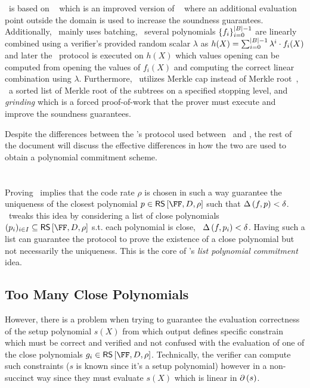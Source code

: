 \documentclass[a4paper,10pt]{article}
\begin{document}
			\plonkyy\ is based on \DEEPFRI~\cite{EPRINT:BGKS19}
			which is an improved version of \FRI~\cite{ICALP:BBHR18} where an additional evaluation
			point outside the domain is used to increase the soundness guarantees.
			Additionally, \plonkyy\ mainly uses batching, \ie\ several polynomials
			$\{f_i\}_{i=0}^{\left\lvert B \right\rvert-1}$ are linearly combined using a verifier's provided
			random scalar $\lambda$ as $h(X) = \sum_{i=0}^{\left\lvert B \right\rvert-1} \lambda^i \cdot f_i(X)$
			and later the \FRI\ protocol is executed on $h(X)$ which values opening can be
			computed from opening the values of $f_i(X)$ and computing the correct
			linear combination using $\lambda$.
			Furthermore, \plonkyy\ utilizes Merkle cap instead of Merkle root~\cite{EPRINT:ChiYog21},
			\ie\ a sorted list of Merkle root of the subtrees on a specified stopping level, and
			\emph{grinding} which is a forced proof-of-work that the prover must execute and improve
			the soundness guarantees.
			
			Despite the differences between the \FRI's protocol used between \plonkyy\ and \redshift,
			the rest of the document will discuss the effective differences in how the two are used
			to obtain a polynomial commitment scheme.
			
			
			

	\section{\redshift}

		Proving \FRI\ implies that the code rate $\rho$ is chosen in such a way guarantee the
		uniqueness of the closest polynomial $p \in \rs{\FF}{D}{\rho}$ such that
		$\Delta\left({f},{p}\right) < \delta$.
		\redshift\ tweaks this idea by considering a list of close polynomials
		$(p_i)_{i\in I} \subseteq \rs{\FF}{D}{\rho}$ s.t. each polynomial is close, \ie\
		$\Delta\left({f},{p_i}\right) < \delta$.
		Having such a list can guarantee the protocol to prove the existence of a close
		polynomial but not necessarily the uniqueness.
		This is the core of \redshift's \emph{list polynomial commitment} idea.
		
		\subsection{Too Many Close Polynomials}
		
		However, there is a problem when trying to guarantee the evaluation correctness of the
		setup polynomial $s(X)$ from which output defines specific constrain which must be
		correct and verified and not confused with the evaluation of one of the close polynomials
		$g_i \in \rs{\FF}{D}{\rho}$.
		Technically, the verifier can compute such constraints ($s$ is known since it's a setup polynomial)
		however in a non-succinct way since they must evaluate $s(X)$ which is linear in $\partial\left({s}\right)$.
		
\end{document}

